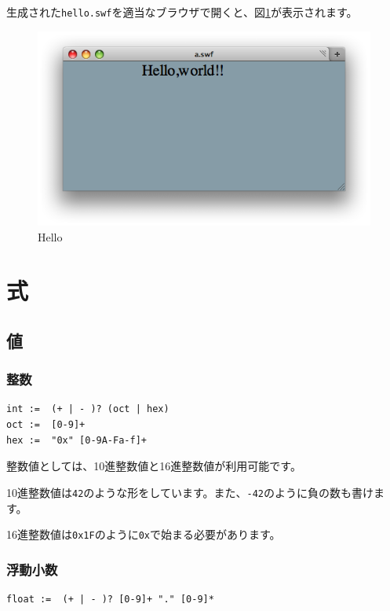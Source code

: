 \documentclass{article}
\begin{document}
生成された\verb!hello.swf!を適当なブラウザで開くと、図\ref{hello}が表示されます。

\begin{figure}
\centering
\includegraphics{hello.png}
\caption{Hello}\label{hello}
\end{figure}

\section{式}
\subsection{値}
\subsubsection{整数}

\begin{verbatim}
int :=  (+ | - )? (oct | hex)
oct :=  [0-9]+
hex :=  "0x" [0-9A-Fa-f]+
\end{verbatim}

整数値としては、10進整数値と16進整数値が利用可能です。

10進整数値は\verb!42!のような形をしています。また、\verb!-42!のように負の数も書けます。

16進整数値は\verb!0x1F!のように\verb!0x!で始まる必要があります。

\subsubsection{浮動小数}
\begin{verbatim}
float :=  (+ | - )? [0-9]+ "." [0-9]*
\end{verbatim}
\end{document}
